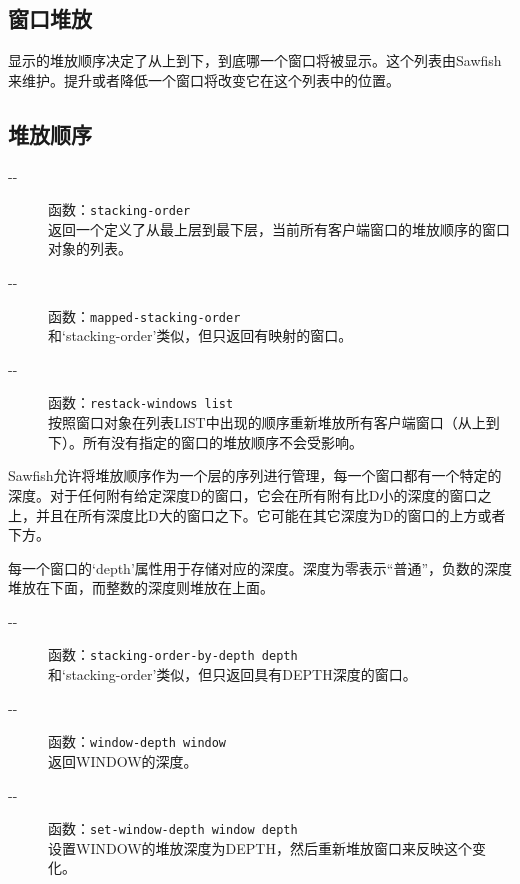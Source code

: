 \documentclass{book}
\begin{document}
\begin{CJK*}{UTF8}{gbsn}
\section{窗口堆放}
显示的堆放顺序决定了从上到下，到底哪一个窗口将被显示。这个列表由Sawfish来维护。提升或者降低一个窗口将改变它在这个列表中的位置。
\subsection{堆放顺序}
\begin{description}
\item[-{}-] 函数：\verb|stacking-order|\\
返回一个定义了从最上层到最下层，当前所有客户端窗口的堆放顺序的窗口对象的列表。
\item[-{}-] 函数：\verb|mapped-stacking-order|\\
和`stacking-order'类似，但只返回有映射的窗口。
\item[-{}-] 函数：\verb|restack-windows list|\\
按照窗口对象在列表LIST中出现的顺序重新堆放所有客户端窗口（从上到下）。所有没有指定的窗口的堆放顺序不会受影响。
\end{description}

Sawfish允许将堆放顺序作为一个层的序列进行管理，每一个窗口都有一个特定的深度。对于任何附有给定深度D的窗口，它会在所有附有比D小的深度的窗口之上，并且在所有深度比D大的窗口之下。它可能在其它深度为D的窗口的上方或者下方。

每一个窗口的`depth'属性用于存储对应的深度。深度为零表示``普通''，负数的深度堆放在下面，而整数的深度则堆放在上面。
\begin{description}
\item[-{}-] 函数：\verb|stacking-order-by-depth depth|\\
和`stacking-order'类似，但只返回具有DEPTH深度的窗口。
\item[-{}-] 函数：\verb|window-depth window|\\
返回WINDOW的深度。
\item[-{}-] 函数：\verb|set-window-depth window depth|\\
设置WINDOW的堆放深度为DEPTH，然后重新堆放窗口来反映这个变化。
\end{description}


\end{CJK*}
\end{document}
